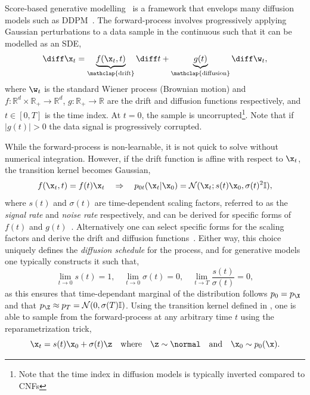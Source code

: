 Score-based generative modelling~\cite{ScoreMatching, ScoreBasedGenerativeModeling} is a framework that envelops many diffusion models such as DDPM~\cite{DDPM}.
The forward-process involves progressively applying Gaussian perturbations to a data sample in the continuous such that it can be modelled as an SDE,
\begin{equation}
    \label{eq:sde}
    \diff \x_t = \underbrace{f(\x_t, t)}_{\mathclap{\text{drift}}} \diff t + \underbrace{g(t)}_{\mathclap{\text{diffusion}}} \diff \w_t,
\end{equation}
where $\w_t$ is the standard Wiener process (Brownian motion) and $f: \mathbb{R}^d \times \mathbb{R}_{+} \rightarrow \mathbb{R}^d$, $g: \mathbb{R}_{+} \rightarrow \mathbb{R}$ are the drift and diffusion functions respectively, and $t \in [0, T]$ is the time index.
At $t=0$, the sample is uncorrupted\footnote{Note that the time index in diffusion models is typically inverted compared to CNFs}.
Note that if $|g(t)| > 0$ the data signal is progressively corrupted.

While the forward-process is non-learnable, it is not quick to solve without numerical integration.
However, if the drift function is affine with respect to $\x_t$, the transition kernel becomes Gaussian,
\begin{equation}
    \label{eq:gaussian_kernel}
    f(\x_t, t) = f(t)\x_t \quad \Rightarrow \quad p_{0t}(\x_t|\x_0) = \mathcal{N}(\x_t; s(t)\x_0, \sigma(t)^2 \mathbb{I}),
\end{equation}
where $s(t)$ and $\sigma(t)$ are time-dependent scaling factors, referred to as the \textit{signal rate} and \textit{noise rate} respectively, and can be derived for specific forms of $f(t)$ and $g(t)$~\cite{sarkka2019applied}.
Alternatively one can select specific forms for the scaling factors and derive the drift and diffusion functions~\cite{ElucidatingDesignSpace}.
Either way, this choice uniquely defines the \textit{diffusion schedule} for the process, and for generative models one typically constructs it such that,
\begin{equation}
    \label{eq:diffusion_schedule}
    \lim_{t \rightarrow 0} s(t) = 1, \quad \lim_{t \rightarrow 0} \sigma(t) = 0, \quad \lim_{t \rightarrow T} \frac{s(t)}{\sigma(t)} = 0,
\end{equation}
as this ensures that time-dependant marginal of the distribution follows $p_0 = p_\X$ and that $p_\Z \approx p_T = \mathcal{N}(0, \sigma(T) \mathbb{I})$.
Using the transition kernel defined in , one is able to sample from the forward-process at any arbitrary time $t$ using the reparametrization trick,
\begin{equation}
    \label{eq:reparametrization}
    \x_t = s(t)\x_0 + \sigma(t) \z \quad \text{where} \quad \z \sim \normal \quad \text{and} \quad \x_0 \sim p_0(\x).
\end{equation}

